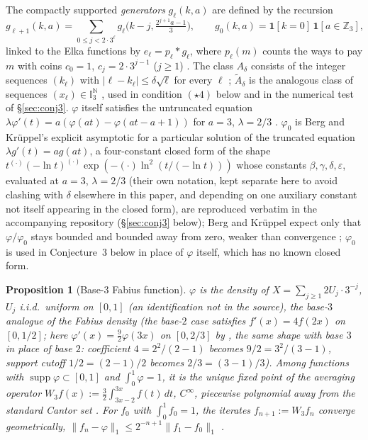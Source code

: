 \documentclass[11pt]{article}
\newtheorem{proposition}[theorem]{Proposition}
\theoremstyle{remark}
\begin{document}
The compactly supported \emph{generators} $g_\ell(k,a)$ are defined by
the recursion \cite[\S2, eq.~(2.1)]{Wirsching2003}
\begin{equation}\label{eq:g-recursion}
 g_{\ell+1}(k,a)=\sum_{0\le j<2\cdot3^\ell}
 g_\ell\bigl(k-j,\tfrac{2^{j+1}a-1}{3}\bigr),
 \qquad g_0(k,a)=\mathbf 1[k=0]\,\mathbf1[a\in\mathbb Z_3],
\end{equation}
linked to the Elka functions by $e_\ell=p_\ell*g_\ell$, where
$p_\ell(m)$ counts the ways to pay $m$ with coins $c_0=1$,
$c_j=2\cdot3^{j-1}$ ($j\ge1$) \cite[\S2]{Wirsching2003}. The class
$A_\delta$ consists of the integer sequences $(k_\ell)$ with
$|\ell-k_\ell|\le\delta\sqrt\ell$ for every $\ell$
\cite[eq.~(1.5)]{Wirsching2003}; $\widetilde A_\delta$ is the
analogous class of sequences $(x_\ell)\in\mathbb I_3^{\mathbb N}$
\cite[eq.~(3.2)]{Wirsching2003}, used in condition
$(\star4)$ below and in the numerical test of \S\ref{sec:conj3}.
$\varphi$ itself satisfies the
untruncated equation $\lambda\varphi'(t)=a(\varphi(at)-\varphi(at-a+1))$
for $a=3$, $\lambda=2/3$ \cite[eq.~(7.9)]{Wirsching2003}. $\varphi_0$
is Berg and Kr\"uppel's explicit asymptotic
\cite[Proposition~9.1, eq.~(9.6)]{BergKruppel1998} for a particular
solution of the truncated equation $\lambda g'(t)=ag(at)$, a
four-constant closed form of the shape
$t^{(\cdot)}(-\ln t)^{(\cdot)}\exp(-(\cdot)\ln^2(t/(-\ln t)))$
whose constants $\beta,\gamma,\delta,\varepsilon$, evaluated at
$a=3$, $\lambda=2/3$ (their own notation, kept separate here to avoid
clashing with $\delta$ elsewhere in this paper, and depending on one
auxiliary constant not itself appearing in the closed form), are
reproduced verbatim in the accompanying repository
(\S\ref{sec:conj3} below);
Berg and Kr\"uppel
expect only that $\varphi/\varphi_0$ stays bounded and bounded away
from zero, weaker than convergence
\cite[eq.~(7.10)--(7.11)]{Wirsching2003}; $\varphi_0$ is used in
Conjecture~3 below in place of $\varphi$ itself, which has no known
closed form.

\begin{proposition}[Base-$3$ Fabius function]\label{prop:fabius}
$\varphi$ is the density of $X=\sum_{j\ge1}2U_j\cdot3^{-j}$, $U_j$
i.i.d.\ uniform on $[0,1]$ (an identification not in the source), the
base-$3$ analogue of the Fabius density (the base-$2$ case satisfies
$f'(x)=4f(2x)$ on $[0,1/2]$; here $\varphi'(x)=
\tfrac92\varphi(3x)$ on $[0,2/3]$ by \cite[eq.~(7.7)]{Wirsching2003},
the same shape with base $3$ in place of base $2$: coefficient
$4=2^2/(2-1)$ becomes $9/2=3^2/(3-1)$, support cutoff
$1/2=(2-1)/2$ becomes $2/3=(3-1)/3$).
Among functions with $\operatorname{supp}\varphi\subset[0,1]$ and
$\int_0^1\varphi=1$, it is the unique fixed point of the averaging
operator $W_3f(x):=\tfrac32\int_{3x-2}^{3x}f(t)\,dt$, $C^\infty$,
piecewise polynomial away from the standard Cantor set
\cite[Corollary~7]{Wirsching2003}. For $f_0$ with $\int_0^1f_0=1$, the
iterates $f_{n+1}:=W_3f_n$ converge geometrically,
$\|f_n-\varphi\|_1\le2^{-n+1}\|f_1-f_0\|_1$
\cite[Corollary~8]{Wirsching2003}.
\end{proposition}
\end{document}
